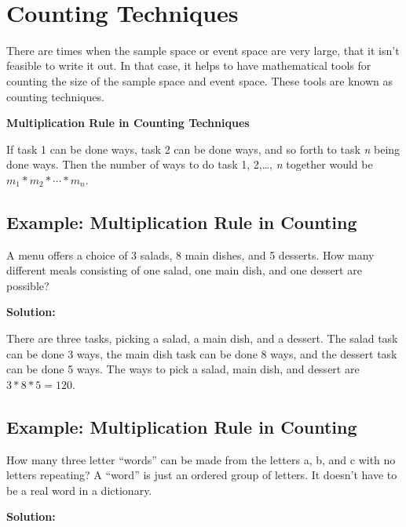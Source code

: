 \documentclass[
]{book}
\begin{document}
\textbf{\\
}

\hypertarget{counting-techniques}{%
\section{Counting Techniques}\label{counting-techniques}}

There are times when the sample space or event space are very large, that it isn't feasible to write it out. In that case, it helps to have mathematical tools for counting the size of the sample space and event space. These tools are known as counting techniques.

\textbf{Multiplication Rule in Counting Techniques}

If task 1 can be done ways, task 2 can be done ways, and so forth to task \emph{n} being done ways. Then the number of ways to do task 1, 2,\ldots, \emph{n} together would be \(m_{1}*m_{2}*\cdots *m_{n}\).

\hypertarget{example-multiplication-rule-in-counting}{%
\subsection{Example: Multiplication Rule in Counting}\label{example-multiplication-rule-in-counting}}

A menu offers a choice of 3 salads, 8 main dishes, and 5 desserts. How many different meals consisting of one salad, one main dish, and one dessert are possible?

\textbf{Solution:}

There are three tasks, picking a salad, a main dish, and a dessert. The salad task can be done 3 ways, the main dish task can be done 8 ways, and the dessert task can be done 5 ways. The ways to pick a salad, main dish, and dessert are \(3*8*5=120\).

\hypertarget{example-multiplication-rule-in-counting-1}{%
\subsection{Example: Multiplication Rule in Counting}\label{example-multiplication-rule-in-counting-1}}

How many three letter ``words'' can be made from the letters a, b, and c with no letters repeating? A ``word'' is just an ordered group of letters. It doesn't have to be a real word in a dictionary.

\textbf{Solution:}
\end{document}
